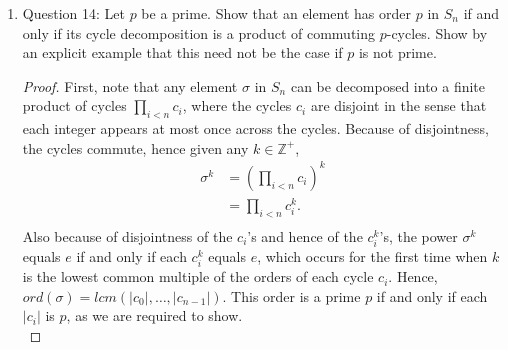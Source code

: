 \documentclass{article}
\begin{document}
\begin{enumerate}
\begin{enumerate}
\begin{proof}
          To prove the converse, assume $i$ and $m$ are relatively prime.
          Then there are integers $a,b\in\mathbb{Z}$ such that $ia+mb=1$.
          Note that the order of $\sigma^i$ must be smaller or equal $m$
          since $(\sigma^i)^m = (\sigma^m)^i = e^i = e$.
          Assume by contradiction that $\sigma^i$ has an order $k$ smaller
          than $m$. Then
          \begin{align*}
            \sigma^k  &= \sigma^{1\cdot k} \\
                      &= \sigma^{(ia+mb)\cdot k} \\
                      &= \sigma^{(ika+mbk)} \\
                      &= ((\sigma^i)^k)^a \cdot (\sigma^m)^{bk} \\
                      &= e^a \cdot e^{bk} \\
                      &= e, \\
          \end{align*}
          which contradicts the order of $\sigma$.
        \end{proof}
      \item Question 14: Let $p$ be a prime. Show that an element has order
        $p$ in $S_n$ if and only if its cycle decomposition is a product of
        commuting $p$-cycles. Show by an explicit example that this need
        not be the case if $p$ is not prime.
        \begin{proof}
          First, note that any element $\sigma$ in $S_n$ can be decomposed
          into a finite product of cycles $\prod_{i<n}{c_i}$, where the
          cycles $c_i$ are disjoint in the sense that each integer appears
          at most once across the cycles. Because of disjointness, the
          cycles commute, hence given any $k\in\mathbb{Z}^+$,
          \begin{align*}
            \sigma^k  & = \left(\prod_{i<n}{c_i}\right)^k \\
                      & = \prod_{i<n}{c_i^k}. \\
          \end{align*}
          Also because of disjointness of the $c_i$'s and hence of the
          $c_i^k$'s, the power $\sigma^k$ equals $e$ if and only if each
          $c_i^k$ equals $e$, which occurs for the first time when $k$ is
          the lowest common multiple of the orders of each cycle $c_i$.
          Hence, $ord(\sigma) = lcm(|c_0|,\ldots,|c_{n-1}|)$. This order is
          a prime $p$ if and only if each $|c_i|$ is $p$, as we are
          required to show. \\


\end{proof}
\end{enumerate}
\end{enumerate}
\end{document}
